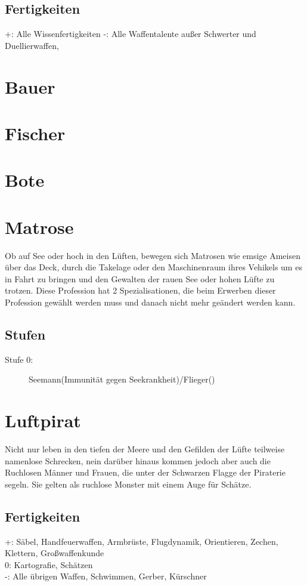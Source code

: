 \documentclass[a4paper,12pt,oneside]{book}
\begin{document}
\subsection{Fertigkeiten}
+: Alle Wissenfertigkeiten
-: Alle Waffentalente außer Schwerter und Duellierwaffen, 
\section{Bauer}

\section{Fischer}

\section{Bote}

\section{Matrose}
Ob auf See oder hoch in den Lüften, bewegen sich Matrosen wie emsige Ameisen über das Deck, durch die Takelage oder den Maschinenraum ihres Vehikels um es in Fahrt zu bringen und den Gewalten der rauen See oder hohen Lüfte zu trotzen. Diese Profession hat 2 Spezialisationen, die beim Erwerben dieser Profession gewählt werden muss und danach nicht mehr geändert werden kann.
\subsection{Stufen}
\begin{description}
\item[Stufe 0:]Seemann(Immunität gegen Seekrankheit)/Flieger()
\end{description}

\section{Luftpirat}
Nicht nur leben in den tiefen der Meere und den Gefilden der Lüfte teilweise namenlose Schrecken, nein darüber hinaus kommen jedoch aber auch die Ruchlosen Männer und Frauen, die unter der Schwarzen Flagge der Piraterie segeln. Sie gelten als ruchlose Monster mit einem Auge für Schätze.
\subsection{Fertigkeiten}
+: Säbel, Handfeuerwaffen, Armbrüste, Flugdynamik, Orientieren, Zechen, Klettern, Großwaffenkunde
\\0: Kartografie, Schätzen
\\-: Alle übrigen Waffen, Schwimmen, Gerber, Kürschner
\end{document}
